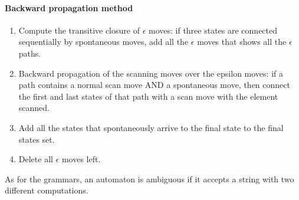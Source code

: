 			\paragraph{Backward propagation method}
				\begin{enumerate}
					\item Compute the transitive closure of $\epsilon$ moves: if three states are connected sequentially by spontaneous moves, add all the $\epsilon$ moves that shows all the $\epsilon$ paths.
					\item Backward propagation of the scanning moves over the epsilon moves: if a path contains a normal scan move AND a spontaneous move, then connect the first and last states of that path with a scan move with the element scanned.
					\item Add all the states that spontaneously arrive to the final state to the final states set.
					\item Delete all $\epsilon$ moves left.
				\end{enumerate}
				
			\begin{definition}[Ambiguity]
				As for the grammars, an automaton is ambiguous if it accepts a string with two different computations. 
			\end{definition}
	
